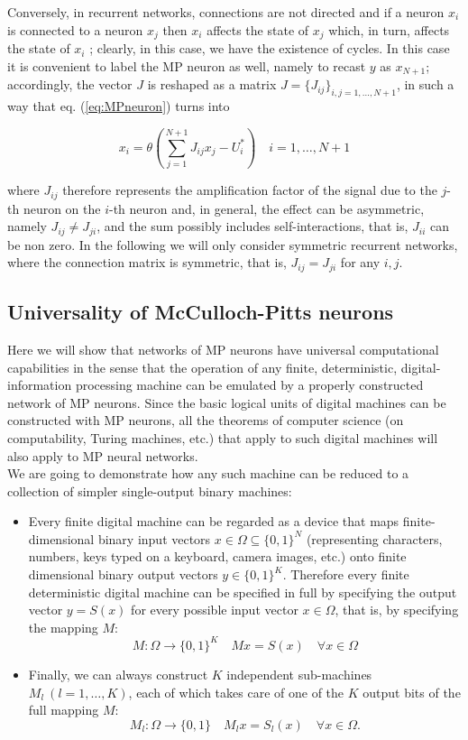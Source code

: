 \noindent
Conversely, in recurrent networks, connections are not directed and if a neuron $x_i$ is connected to a neuron $x_j$ then $x_i$ affects the state of $x_j$ which, in turn, affects the state of $x_i$ ; clearly, in this case, we have the existence of cycles. In this case it is convenient to label the MP neuron as well, namely to recast $y$ as $x_{N +1}$; accordingly, the vector $J$ is reshaped as a matrix $J = \{J_{ij} \}_{i,j=1,...,N +1}$, in such a way that eq. (\ref{eq:MPneuron}) turns into

\begin{equation}
    x_i = \theta(\sum\limits_{j=1}^{N +1} J_{ij} x_j - U_i^*) \quad i = 1, \ldots, N +1
\end{equation}

\noindent
where $J_{ij}$ therefore represents the amplification factor of the signal due to the $j$-th neuron on the $i$-th neuron and, in general, the effect can be asymmetric, namely $J_{ij} \neq J_{ji}$, and the sum possibly includes self-interactions, that is, $J_{ii}$ can be non zero. In the following we will only consider symmetric recurrent networks, where the connection matrix is symmetric, that is, $J_{ij} = J_{ji}$ for any $i, j$.

\subsection{Universality of McCulloch-Pitts neurons}

Here we will show that networks of MP neurons have universal computational capabilities in the sense that the operation of any finite, deterministic, digital-information processing machine can be emulated by a properly constructed network of MP neurons. Since the
basic logical units of digital machines can be constructed with MP neurons, all the theorems of computer science (on computability, Turing machines, etc.) that apply to such digital machines will also apply to MP neural networks.
\\

\noindent
We are going to demonstrate how any such machine can be reduced to a collection of simpler single-output binary machines:

\begin{itemize}
    \item Every finite digital machine can be regarded as a device that maps finite-dimensional binary input vectors $x \in \Omega \subseteq \{0, 1\}^N$ (representing characters, numbers, keys typed on a keyboard, camera images, etc.) onto finite dimensional binary output vectors $y \in \{0, 1\}^K$. Therefore every finite deterministic digital machine can be specified in full by specifying the output vector $y = S(x)$ for every possible input vector $x \in \Omega$, that is, by specifying the mapping $M:$
    $$ M : \Omega \rightarrow \{0, 1\}^K \quad M x = S(x) \quad \forall x \in \Omega $$
    \item Finally, we can always construct $K$ independent sub-machines $M_l \ ( l= 1, \ldots, K)$, each of which takes care of one of the $K$ output bits of the full mapping $M:$
    $$ M_l : \Omega \rightarrow \{0, 1\} \quad M_l x = S_l (x) \quad \forall x \in \Omega. $$
\end{itemize}


